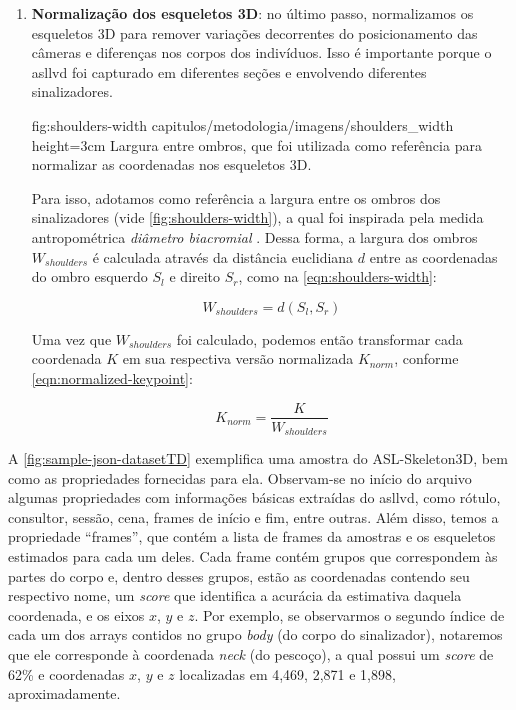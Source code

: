 \begin{enumerate}
    \item \textbf{Normalização dos esqueletos 3D}: no último passo, normalizamos os esqueletos 3D para remover variações decorrentes do posicionamento das câmeras e diferenças nos corpos dos indivíduos. Isso é importante porque o \acrshort{asllvd} foi capturado em diferentes seções e envolvendo diferentes sinalizadores.

          \figura
          {fig:shoulders-width} %
          {capitulos/metodologia/imagens/shoulders_width} %
          {height=3cm} %
          {Largura entre ombros, que foi utilizada como referência para normalizar as coordenadas nos esqueletos 3D.} %
          {} %

          Para isso, adotamos como referência a largura entre os ombros dos sinalizadores (vide \autoref{fig:shoulders-width}), a qual foi inspirada pela medida antropométrica \textit{diâmetro biacromial} \cite{stoudt-1970-skinfolds}. Dessa forma, a largura dos ombros \(W_{shoulders}\) é calculada através da distância euclidiana \(d\) \cite{anton-2013-algebra} entre as coordenadas do ombro esquerdo \(S_{l}\) e direito \(S_ {r}\), como na \autoref{eqn:shoulders-width}:

          \begin{equation}
              \label{eqn:shoulders-width}
              W_{shoulders} = d\left(S_{l}, S_{r}\right)
          \end{equation}

          Uma vez que \(W_{shoulders}\) foi calculado, podemos então transformar cada coordenada \(K\) em sua respectiva versão normalizada \(K_{norm}\), conforme \autoref{eqn:normalized-keypoint}:

          \begin{equation}
              \label{eqn:normalized-keypoint}
              K_{norm} = \frac{K}{W_{shoulders}}
          \end{equation}

\end{enumerate}


A \autoref{fig:sample-json-datasetTD} exemplifica uma amostra do ASL-Skeleton3D, bem como as propriedades fornecidas para ela. Observam-se no início do arquivo algumas propriedades com informações básicas extraídas do \acrshort{asllvd}, como rótulo, consultor, sessão, cena, frames de início e fim, entre outras. Além disso, temos a propriedade ``frames'', que contém a lista de frames da amostras e os esqueletos estimados para cada um deles. Cada frame contém grupos que correspondem às partes do corpo e, dentro desses grupos, estão as coordenadas contendo seu respectivo nome, um \textit{score} que identifica a acurácia da estimativa daquela coordenada, e os eixos \(x\), \(y\) e \(z\).
Por exemplo, se observarmos o segundo índice de cada um dos arrays contidos no grupo \textit{body} (do corpo do sinalizador), notaremos que ele corresponde à coordenada \textit{neck} (do pescoço), a qual possui um \textit{score} de 62\% e coordenadas \(x\), \(y\) e \(z\) localizadas em 4,469, 2,871 e 1,898, aproximadamente.

